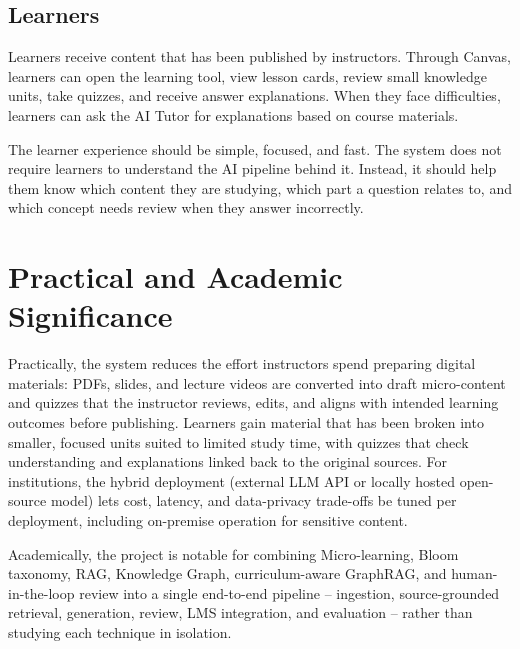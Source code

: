 \subsection{Learners}

Learners receive content that has been published by instructors. Through
Canvas, learners can open the learning tool, view lesson cards, review small
knowledge units, take quizzes, and receive answer explanations. When they face
difficulties, learners can ask the AI Tutor for explanations based on course
materials.

The learner experience should be simple, focused, and fast. The system does not
require learners to understand the AI pipeline behind it. Instead, it should
help them know which content they are studying, which part a question relates
to, and which concept needs review when they answer incorrectly.

\section{Practical and Academic Significance}

Practically, the system reduces the effort instructors spend preparing
digital materials: PDFs, slides, and lecture videos are converted into
draft micro-content and quizzes that the instructor reviews, edits, and
aligns with intended learning outcomes before publishing. Learners gain
material that has been broken into smaller, focused units suited to
limited study time, with quizzes that check understanding and
explanations linked back to the original sources. For institutions, the
hybrid deployment (external LLM API or locally hosted open-source
model) lets cost, latency, and data-privacy trade-offs be tuned per
deployment, including on-premise operation for sensitive content.

Academically, the project is notable for combining Micro-learning, Bloom
taxonomy, RAG, Knowledge Graph, curriculum-aware GraphRAG, and
human-in-the-loop review into a single end-to-end pipeline -- ingestion,
source-grounded retrieval, generation, review, LMS integration, and
evaluation -- rather than studying each technique in isolation.



